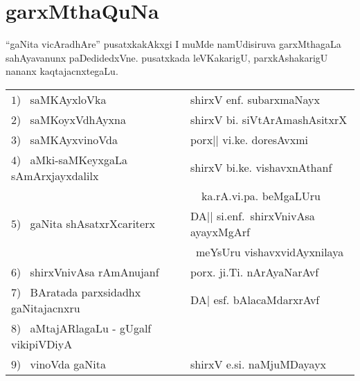 \chapter{garxMthaQuNa}

``gaNita vicAradhAre''  pusatxkakAkxgi I muMde namUdisiruva garxMthagaLa sahAyavanunx paDedidedxVne. pusatxkada leVKakarigU, parxkAshakarigU nananx kaqtajacnxtegaLu.

\begin{tabular}{ll}
$1$)~ saMKAyxloVka & shirxV enf. subarxmaNayx\\[0.1cm]
$2$)~ saMKoyxVdhAyxna & shirxV bi. siVtArAmashAsitxrX\\[0.1cm]
$3$)~ saMKAyxvinoVda & porx|| vi.ke. doresAvxmi\\[0.1cm]
  $4$)~ aMki-saMKeyxgaLa sAmArxjayxdalilx & shirxV bi.ke. vishavxnAthanf\\
  & ~~ka.rA.vi.pa. beMgaLUru\\[0.1cm]
  $5$)~ gaNita shAsatxrXcariterx & DA|| si.enf.~shirxVnivAsa ayayxMgArf \\
  & ~meYsUru vishavxvidAyxnilaya\\[0.1cm]
$6$)~ shirxVnivAsa rAmAnujanf &  porx. ji.Ti. nArAyaNarAvf\\[0.1cm]
$7$)~ BAratada parxsidadhx gaNitajacnxru & DA| esf. bAlacaMdarxrAvf\\[0.1cm]
$8$)~ aMtajARlagaLu - gUgalf vikipiVDiyA &\\[0.1cm]
$9$)~ vinoVda gaNita & shirxV e.si. naMjuMDayayx
\end{tabular}
  
